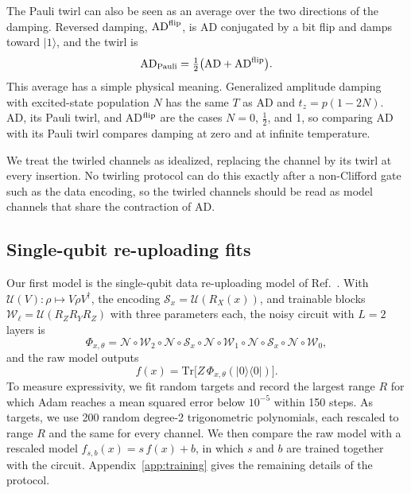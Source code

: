 \documentclass[
 aps,pra,
 twocolumn,
 superscriptaddress,
 longbibliography,
 nofootinbib
]{revtex4-2}
\newcommand{\Tr}{\mathrm{Tr}}
\providecommand{\ket}[1]{\lvert #1 \rangle}
\providecommand{\bra}[1]{\langle #1 \rvert}
\newcommand{\AD}{\mathrm{AD}}
\begin{document}
The Pauli twirl can also be seen as an average over the two directions of the
damping. Reversed damping, $\AD^{\rm flip}$, is AD conjugated by a bit flip and damps
toward $\ket1$, and the twirl is
\begin{equation}
\AD_{\rm Pauli}=\tfrac12\bigl(\AD+\AD^{\rm flip}\bigr).
\label{eq:twirl_mix}
\end{equation}
This average has a simple physical meaning. Generalized amplitude
damping~\cite{nielsen2010quantum} with excited-state population $N$ has the
same $T$ as AD and $t_z=p(1-2N)$. AD, its Pauli twirl, and AD$^{\rm flip}$ are
the cases $N=0$, $\frac12$, and 1, so comparing AD with its Pauli twirl compares
damping at zero and at infinite temperature.

We treat the twirled channels as idealized, replacing the channel by its twirl
at every insertion. No twirling protocol can do this exactly after a
non-Clifford gate such as the data encoding, so the twirled channels should be
read as model channels that share the contraction of AD.

\subsection{Single-qubit re-uploading fits}
\label{sec:model_vr}

Our first model is the single-qubit data re-uploading model of
Ref.~\cite{vanrossum2026biased}. With $\mathcal U(V)\colon\rho\mapsto V\rho
V^\dagger$, the encoding $\mathcal S_x=\mathcal U(R_X(x))$, and trainable
blocks $\mathcal W_\ell=\mathcal U(R_ZR_YR_Z)$ with three parameters each, the
noisy circuit with $L=2$ layers is
\begin{equation}
\Phi_{x,\theta}=\mathcal N\circ\mathcal W_2\circ\mathcal N\circ\mathcal S_x
\circ\mathcal N\circ\mathcal W_1\circ\mathcal N\circ\mathcal S_x\circ\mathcal N
\circ\mathcal W_0 ,
\label{eq:vr_map}
\end{equation}
and the raw model outputs
\begin{equation}
f(x)=\Tr\bigl[Z\,\Phi_{x,\theta}(\ket0\bra0)\bigr].
\label{eq:vr_raw}
\end{equation}
To measure expressivity, we fit random targets and record the largest range
$R$ for which Adam reaches a mean squared error below $10^{-5}$ within 150
steps. As targets, we use 200 random degree-2 trigonometric polynomials, each
rescaled to range $R$ and the same for every channel. We then compare the raw
model with a rescaled model $f_{s,b}(x)=s\,f(x)+b$, in which $s$ and $b$ are
trained together with the circuit. Appendix~\ref{app:training} gives the remaining
details of the protocol.
\end{document}
